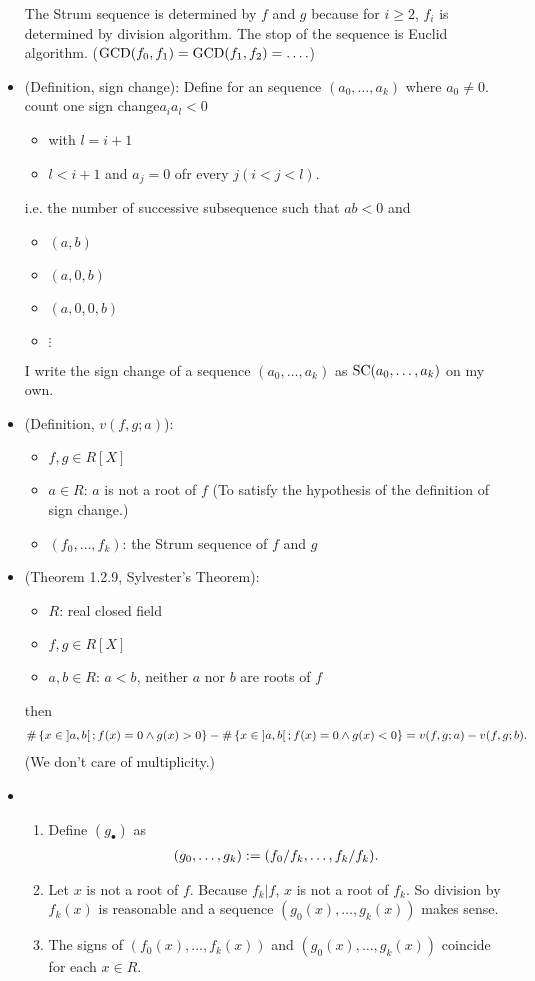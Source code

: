 \documentclass[9pt]{ltjsarticle}
\begin{document}
\begin{itemize}
  \pf
  The Strum sequence is determined by $f$ and $g$ because
  for $i\ge 2$, $f_i$ is determined by division algorithm.
  The stop of the sequence is Euclid algorithm.
  (${\rm GCD}(f_0,f_1)={\rm GCD}(f_1,f_2)=\dots.$)
  \item
  (Definition, sign change):
  Define for an sequence $(a_0,\dots,a_k)$ where $a_0 \neq 0$.
  count one sign change$a_i a_l < 0$
  \begin{itemize}
    \item     with $l=i+1$
    \item $l<i+1$ and $a_j = 0$ ofr every $j (i < j < l)$.
  \end{itemize}

  i.e. the number of successive subsequence such that $ab<0$ and
  \begin{itemize}
    \item $(a,b)$
    \item $(a,0,b)$
    \item $(a,0,0,b)$
    \item $\vdots$
  \end{itemize}

  I write the sign change of a sequence $(a_0,\dots,a_k)$ as $\mathrm{SC}(a_0,\dots,a_k)$
  on my own.
  \item
  (Definition, $v(f,g;a)$):
  \begin{itemize}
    \item $f,g \in R[X]$
    \item $a\in R$: $a$ is not a root of $f$ (To satisfy the hypothesis of the definition of sign change.)
    \item $(f_0,\dots,f_k)$: the Strum sequence of $f$ and $g$
  \end{itemize}
  \item (Theorem 1.2.9, Sylvester's Theorem):
  \begin{itemize}
    \item $R$: real closed field
    \item $f,g \in R[X]$
    \item $a,b \in R$: $a<b$, neither $a$ nor $b$ are roots of $f$
  \end{itemize}
  then
  \begin{align}
    \#\left\{x\in \left] a,b \right[; f(x) = 0 \land g(x)>0\right\} -
    \# \left\{x\in \left] a,b \right[; f(x)=0 \land g(x) < 0\right\} =
    v(f,g;a) - v(f,g;b).
  \end{align}
  (We don't care of multiplicity.)
  \item
  \begin{enumerate}
    \item Define $(g_\bullet)$ as
    \begin{align}
      (g_0,\dots,g_k) := (f_0/f_k,\dots,f_k/f_k).
    \end{align}
    \item
    Let $x$ is not a root of $f$.
    Because $f_k | f$, $x$ is not a root of $f_k$.
    So division by $f_k(x)$ is reasonable and
    a sequence $(g_0(x),\dots,g_k(x))$ makes sense.
    \item
    The signs of $(f_0(x),\dots,f_k(x))$ and $(g_0(x),\dots,g_k(x))$
    coincide for each $x\in R$.


\end{enumerate}
\end{itemize}
\end{document}
